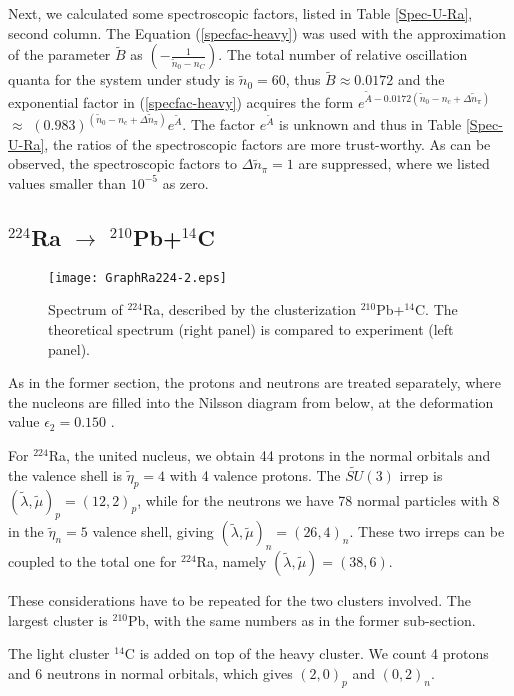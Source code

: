 \documentclass[12pt]{article}
\begin{document}
Next, we calculated some spectroscopic factors, listed in Table \ref{Spec-U-Ra},
second column. The Equation (\ref{specfac-heavy}) was used with the approximation of the
parameter $\widetilde{B}$ as $\left(-\frac{1}{{\tilde n}_0-n_C}\right)$. The total number of relative oscillation
quanta for the system under study is ${\tilde n}_0=60$, thus $\widetilde{B} \approx 0.0172$ and the exponential
factor in (\ref{specfac-heavy}) acquires the form 
$e^{\widetilde{A}-0.0172({\tilde n}_0-n_c+\Delta{\tilde n}_\pi )}$
$\approx$ $(0.983)^{({\tilde n}_0-n_c+\Delta{\tilde n}_\pi )}e^{\widetilde{A}}$. 
The factor $e^{\widetilde{A}}$ is unknown and thus
in Table \ref{Spec-U-Ra}, the ratios of the spectroscopic factors are more trust-worthy. 
As can be observed,
the spectroscopic factors to $\Delta {\tilde n}_\pi = 1$ are suppressed, 
where we listed values smaller than $10^{-5}$ as zero.

\subsection{$^{224}$Ra $\rightarrow$ $^{210}$Pb+$^{14}$C}

\begin{figure}
\centerline{
\texttt{[image: GraphRa224-2.eps]} 
}
\caption{\label{Ra} 
Spectrum of $^{224}$Ra, described by the clusterization $^{210}$Pb+$^{14}$C. The theoretical spectrum
(right panel) is compared to experiment (left panel).
}
\end{figure}

As in the former section, the protons and neutrons are treated separately, 
where the nucleons are filled into the Nilsson
diagram from below, at the deformation value $\epsilon_2 =0.150$ \cite{nix-tables}.

For $^{224}$Ra, the united nucleus, we obtain 44 protons 
in the normal orbitals and the valence shell is
${\widetilde \eta}_p=4$ with 4 valence protons. The $\widetilde{SU}(3)$ irrep
is $(\tilde{\lambda} , \tilde{\mu})_{p} =(12,2)_p$, while for the neutrons we have   
78 normal particles with 8 in the ${\widetilde \eta}_n=5$ valence shell, 
giving $(\tilde{\lambda} , \tilde{\mu})_{n} =(26,4)_n$.
These two irreps can be coupled to the total one for $^{224}$Ra, namely 
$(\tilde{\lambda} , \tilde{\mu}) =(38,6)$.

These considerations have to be repeated for the two clusters involved. The largest cluster is
$^{210}$Pb, with the same numbers as in the former sub-section. 

The light cluster $^{14}$C is added on top of the heavy cluster. We count 4 protons and 6 neutrons
in normal orbitals, which gives $(2,0)_{p}$ and $(0,2)_{n}$.
\end{document}
